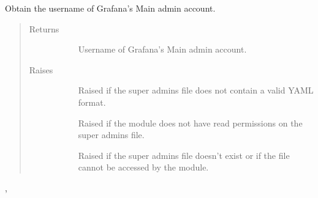 \documentclass[letterpaper,10pt,english]{sphinxmanual}
\begin{document}

\begin{fulllineitems}
\label{\detokenize{yamlUtility:yamlUtility.getSuperAdminLogin}}
Obtain the username of Grafana’s Main admin account.
\begin{quote}\begin{description}
\item[{Returns}] \leavevmode\begin{description}
\item[{}] \leavevmode{[}\sphinxtitleref{str}{]}
Username of Grafana’s Main admin account.

\end{description}

\item[{Raises}] \leavevmode\begin{description}
\item[{}] \leavevmode
Raised if the super admins file does not contain a valid YAML format.

\item[{}] \leavevmode
Raised if the module does not have read permissions on the super admins
file.

\item[{}] \leavevmode
Raised if the super admins file doesn’t exist or if the file cannot be
accessed by the module.

\end{description}

\end{description}\end{quote}




{\hyperref[\detokenize{yamlUtility:yamlUtility.loadConfig}]{}}, {\hyperref[\detokenize{yamlUtility:yamlUtility.getYamlContent}]{}}



\end{fulllineitems}

\end{document}

